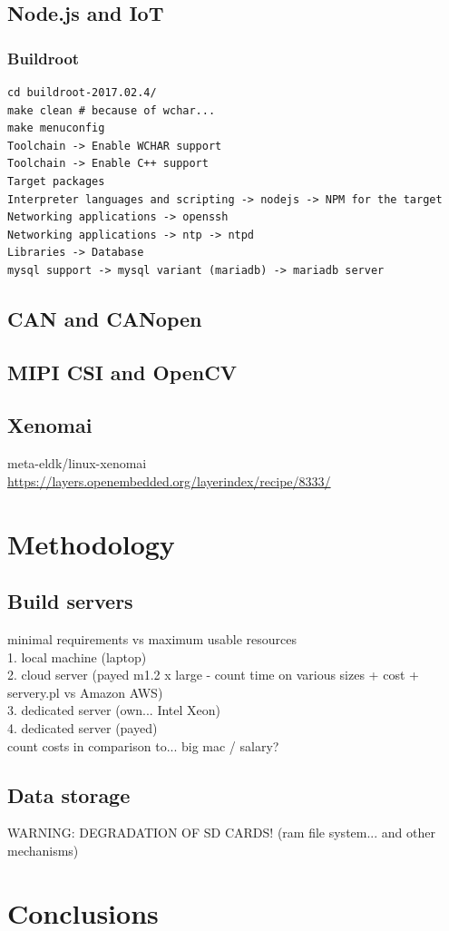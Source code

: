 \documentclass[printmode]{mgr}
\begin{document}
\section{Node.js and IoT}

\subsection{Buildroot}

\begin{lstlisting}
cd buildroot-2017.02.4/
make clean # because of wchar...
make menuconfig
Toolchain -> Enable WCHAR support
Toolchain -> Enable C++ support
Target packages
Interpreter languages and scripting -> nodejs -> NPM for the target
Networking applications -> openssh
Networking applications -> ntp -> ntpd
Libraries -> Database
mysql support -> mysql variant (mariadb) -> mariadb server
\end{lstlisting}

\section{CAN and CANopen}

\section{MIPI CSI and OpenCV}

\section{Xenomai}

meta-eldk/linux-xenomai
\url{https://layers.openembedded.org/layerindex/recipe/8333/}

\chapter{Methodology}
\label{chapter:methodology}

\section{Build servers}
minimal requirements vs maximum usable resources\\
1. local machine (laptop)\\
2. cloud server (payed m1.2 x large - count time on various sizes + cost + servery.pl vs Amazon AWS)\\
3. dedicated server (own... Intel Xeon)\\
4. dedicated server (payed)\\
count costs in comparison to... big mac / salary?



\section{Data storage}
WARNING: DEGRADATION OF SD CARDS! (ram file system... and other mechanisms)

\chapter{Conclusions}
\label{chapter:conclusions}



\listoffigures
\listoftables
\end{document}
